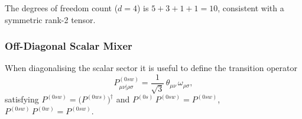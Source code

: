 \documentclass[aps,preprintnumbers,superscriptaddress,longbibliography]{revtex4-1}
\begin{document}
  The degrees of freedom count ($d=4$) is $5 + 3 + 1 + 1 = 10$, consistent with a symmetric rank-2 tensor.

  \subsubsection{Off-Diagonal Scalar Mixer}

  When diagonalising the scalar sector it is useful to define the
  transition operator
  \begin{equation}
      P^{(0sw)}_{\mu\nu|\rho\sigma} =
      \frac{1}{\sqrt{3}}\,\theta_{\mu\nu}\,\omega_{\rho\sigma},
  \end{equation}
  satisfying $P^{(0sw)} = \bigl(P^{(0ws)}\bigr)^\dagger$ and
  $P^{(0s)}\,P^{(0sw)} = P^{(0sw)}$,\;
  $P^{(0sw)}\,P^{(0w)} = P^{(0sw)}$.
  
\end{document}
